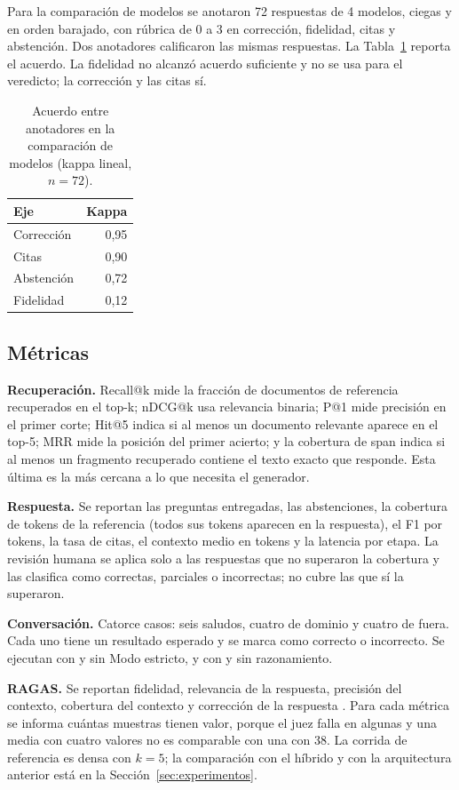 Para la comparaci\'on de modelos se anotaron 72 respuestas de 4 modelos, ciegas y en orden barajado, con r\'ubrica de 0 a 3 en correcci\'on, fidelidad, citas y abstenci\'on. Dos anotadores calificaron las mismas respuestas. La Tabla~\ref{tab:kappa} reporta el acuerdo. La fidelidad no alcanz\'o acuerdo suficiente y no se usa para el veredicto; la correcci\'on y las citas s\'i.

\begin{table}[t]
\centering
\caption{Acuerdo entre anotadores en la comparaci\'on de modelos (kappa lineal, $n=72$).}
\label{tab:kappa}
\begin{tabular}{lr}
\toprule
Eje & Kappa \\
\midrule
Correcci\'on & 0,95 \\
Citas & 0,90 \\
Abstenci\'on & 0,72 \\
Fidelidad & 0,12 \\
\bottomrule
\end{tabular}
\end{table}

\subsection{M\'etricas}

\textbf{Recuperaci\'on.} Recall@k mide la fracci\'on de documentos de referencia recuperados en el top-k; nDCG@k usa relevancia binaria; P@1 mide precisi\'on en el primer corte; Hit@5 indica si al menos un documento relevante aparece en el top-5; MRR mide la posici\'on del primer acierto; y la cobertura de span indica si al menos un fragmento recuperado contiene el texto exacto que responde. Esta \'ultima es la m\'as cercana a lo que necesita el generador.

\textbf{Respuesta.} Se reportan las preguntas entregadas, las abstenciones, la cobertura de tokens de la referencia (todos sus tokens aparecen en la respuesta), el F1 por tokens, la tasa de citas, el contexto medio en tokens y la latencia por etapa. La revisi\'on humana se aplica solo a las respuestas que no superaron la cobertura y las clasifica como correctas, parciales o incorrectas; no cubre las que s\'i la superaron.

\textbf{Conversaci\'on.} Catorce casos: seis saludos, cuatro de dominio y cuatro de fuera. Cada uno tiene un resultado esperado y se marca como correcto o incorrecto. Se ejecutan con y sin Modo estricto, y con y sin razonamiento.

\textbf{RAGAS.} Se reportan fidelidad, relevancia de la respuesta, precisi\'on del contexto, cobertura del contexto y correcci\'on de la respuesta \cite{es2023ragas}. Para cada m\'etrica se informa cu\'antas muestras tienen valor, porque el juez falla en algunas y una media con cuatro valores no es comparable con una con 38. La corrida de referencia es densa con $k=5$; la comparaci\'on con el h\'ibrido y con la arquitectura anterior est\'a en la Secci\'on~\ref{sec:experimentos}.

